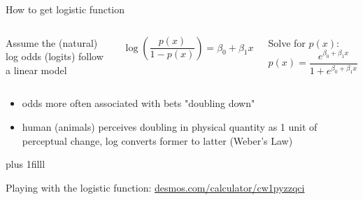 \documentclass[aspectratio=169,usenames,dvipsnames]{beamer}
\newcommand{\InstructorList}[1]{
\begin{itemize}
	\color{orange}
	#1
\end{itemize}
}
\newcommand{\bvfill}{\vskip0pt plus 1filll}
\begin{document}



\begin{frame}[c]{How to get logistic function}

\begin{columns}
\centering
Assume the (natural) log odds (logits) follow a linear model

\begin{equation*}
	\log \left( \frac{p(x)}{1-p(x)} \right) = \beta_0 + \beta_1x
\end{equation*}


\centering
Solve for $p(x)$:
\begin{equation*}
	p(x) = \frac{e^{\beta_0 + \beta_1x}}{1+e^{\beta_0 + \beta_1x}}
\end{equation*}
\end{columns}
\InstructorList{
	\item odds more often associated with bets "doubling down"
	\item human (animals) perceives doubling in physical quantity as 1 unit of perceptual change, log converts former to latter (Weber's Law)
}
\bvfill

Playing with the logistic function: \href{https://www.desmos.com/calculator/cw1pyzzqci}{desmos.com/calculator/cw1pyzzqci}
\end{frame}





\end{document}

